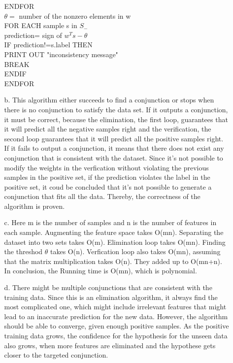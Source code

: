 \begin{enumerate}
\begin{enumerate}
	    ENDFOR\\
	    \(\theta=\) number of the nonzero elements in w\\
	    FOR EACH sample s in \(S_-\)\\
	    \hspace*{5 mm} prediction= sign of \(w^Ts - \theta\)\\
	    \hspace*{5 mm} IF prediction!=s.label THEN\\
	    \hspace*{10 mm} PRINT OUT "inconsistency message"\\
	    \hspace*{10 mm} BREAK\\
	    \hspace*{5 mm} ENDIF\\
	    ENDFOR\\
		\item[b.] This algorithm either succeeds to find a conjunction or stops when there is no conjunction to satisfy the data set. If it outputs a conjunction, it must be correct, because the elimination, the first loop, guarantees that it will predict all the negative samples right and the verification, the second loop guarantees that it will predict all the positive samples right. If it fails to output a conjunction, it means that there does not exist any conjunction that is consistent with the dataset. Since it's not possible to modify the weights in the verfication without violating the previous samples in the positive set, if the prediction violates the label in the positive set, it coud be concluded that it's not possible to generate a conjunction that fits all the data. Thereby, the correctness of the algorithm is proven.
		\item[c.]Here m is the number of samples and n is the number of features in each sample. Augmenting the feature space takes O(mn). Separating the dataset into two sets takes O(m). Elimination loop takes O(mn). Finding the threshod \(\theta\) takes O(n). Verfication loop also takes O(mn), assuming that the matrix multiplication takes O(n). They added up to O(mn+n). In conclusion, the Running time is O(mn), which is polynomial.
		\item[d.] There might be multiple conjunctions that are consistent with the training data. Since this is an elimination algorithm, it always find the most complicated one, which might include irrelevant features that might lead to an inaccurate prediction for the new data. However, the algorithm should be able to converge, given enough positive samples. As the positive training data grows, the confidence for the hypothesis for the unseen data also grows, when more features are eliminated and the hypothese gets closer to the targeted conjunction.\\

\end{enumerate}
\end{enumerate}
